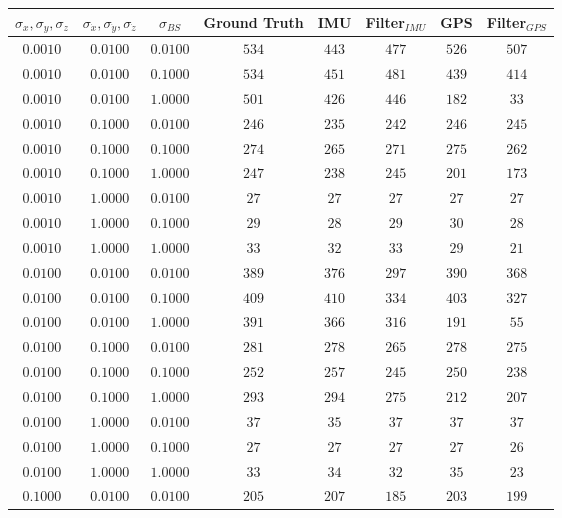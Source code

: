 \begin{table}[H]
    \centering
    \begin{tabular}{|c|c|c|c|c|c|c|c|}
        \hline
        $\sigma_x, \sigma_y, \sigma_z$ & $\sigma_{\dot{x}}, \sigma_{\dot{y}}, \sigma_{\dot{z}}$ & $\sigma_{BS}$ & Ground Truth & IMU & Filter$_{IMU}$ & GPS & Filter$_{GPS}$ \\
        \hline
            $0.0010$ & $0.0100$ & $0.0100$ & $534$ & $443$ & $477$ & $526$ & $507$ \\
        $0.0010$ & $0.0100$ & $0.1000$ & $534$ & $451$ & $481$ & $439$ & $414$ \\
        $0.0010$ & $0.0100$ & $1.0000$ & $501$ & $426$ & $446$ & $182$ & $33$ \\
        $0.0010$ & $0.1000$ & $0.0100$ & $246$ & $235$ & $242$ & $246$ & $245$ \\
        $0.0010$ & $0.1000$ & $0.1000$ & $274$ & $265$ & $271$ & $275$ & $262$ \\
        $0.0010$ & $0.1000$ & $1.0000$ & $247$ & $238$ & $245$ & $201$ & $173$ \\
        $0.0010$ & $1.0000$ & $0.0100$ & $27$ & $27$ & $27$ & $27$ & $27$ \\
        $0.0010$ & $1.0000$ & $0.1000$ & $29$ & $28$ & $29$ & $30$ & $28$ \\
        $0.0010$ & $1.0000$ & $1.0000$ & $33$ & $32$ & $33$ & $29$ & $21$ \\
        $0.0100$ & $0.0100$ & $0.0100$ & $389$ & $376$ & $297$ & $390$ & $368$ \\
        $0.0100$ & $0.0100$ & $0.1000$ & $409$ & $410$ & $334$ & $403$ & $327$ \\
        $0.0100$ & $0.0100$ & $1.0000$ & $391$ & $366$ & $316$ & $191$ & $55$ \\
        $0.0100$ & $0.1000$ & $0.0100$ & $281$ & $278$ & $265$ & $278$ & $275$ \\
        $0.0100$ & $0.1000$ & $0.1000$ & $252$ & $257$ & $245$ & $250$ & $238$ \\
        $0.0100$ & $0.1000$ & $1.0000$ & $293$ & $294$ & $275$ & $212$ & $207$ \\
        $0.0100$ & $1.0000$ & $0.0100$ & $37$ & $35$ & $37$ & $37$ & $37$ \\
        $0.0100$ & $1.0000$ & $0.1000$ & $27$ & $27$ & $27$ & $27$ & $26$ \\
        $0.0100$ & $1.0000$ & $1.0000$ & $33$ & $34$ & $32$ & $35$ & $23$ \\
        $0.1000$ & $0.0100$ & $0.0100$ & $205$ & $207$ & $185$ & $203$ & $199$ \\

\end{tabular}
\end{table}
